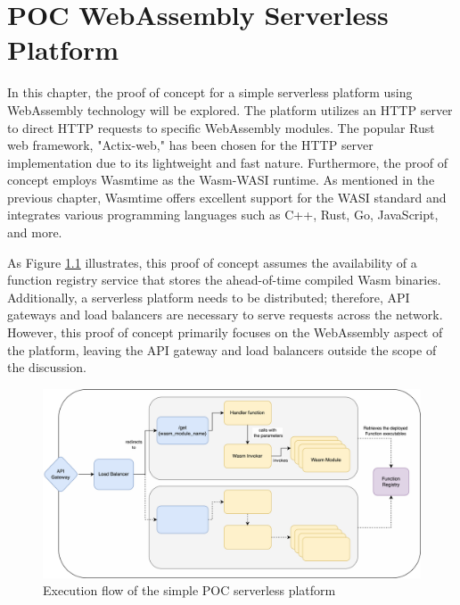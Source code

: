 \chapter{POC WebAssembly Serverless Platform}
\label{chap:poc}

In this chapter, the proof of concept for a simple serverless platform using WebAssembly technology will be explored. The platform utilizes an HTTP server to direct HTTP requests to specific WebAssembly modules. The popular Rust web framework, "Actix-web," has been chosen for the HTTP server implementation due to its lightweight and fast nature. Furthermore, the proof of concept employs Wasmtime as the Wasm-WASI runtime. As mentioned in the previous chapter, Wasmtime offers excellent support for the WASI standard and integrates various programming languages such as C++, Rust, Go, JavaScript, and more.

As Figure \ref{fig:poc} illustrates, this proof of concept assumes the availability of a function registry service that stores the ahead-of-time compiled Wasm binaries. Additionally, a serverless platform needs to be distributed; therefore, API gateways and load balancers are necessary to serve requests across the network. However, this proof of concept primarily focuses on the WebAssembly aspect of the platform, leaving the API gateway and load balancers outside the scope of the discussion.

\begin{figure}[H]
	\centering
		\includegraphics[width=1\linewidth]{images/poc/poc.pdf}
	\caption{Execution flow of the simple POC serverless platform}
	\label{fig:poc}
\end{figure}



